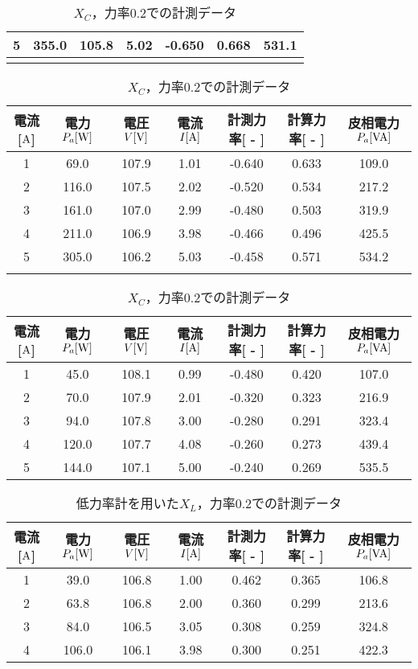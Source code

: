\begin{itemize}
\begin{table}[h]
\begin{tabular}{ccccccc}
	5 & 355.0 & 105.8 & 5.02 & -0.650 & 0.668 & 531.1 \\ \hline\\
\end{tabular}
	\caption{$X_{C}$，力率$0.4$での計測データ}
	\label{tab:0.4data2}
\begin{tabular}{ccccccc}
	\hline
	電流[$\rm{A}$] & 電力$P_a[\rm{W}]$ & 電圧$V[\rm{V}]$ & 電流$I[\rm{A}]$ & 計測力率[ - ] & 計算力率[ - ] & 皮相電力$P_a[\rm{VA}]$ \\ \hline
	1 & 69.0  & 107.9 & 1.01 & -0.640 & 0.633 & 109.0 \\
	2 & 116.0 & 107.5 & 2.02 & -0.520 & 0.534 & 217.2 \\
	3 & 161.0 & 107.0 & 2.99 & -0.480 & 0.503 & 319.9 \\
	4 & 211.0 & 106.9 & 3.98 & -0.466 & 0.496 & 425.5 \\
	5 & 305.0 & 106.2 & 5.03 & -0.458 & 0.571 & 534.2 \\ \hline\\
\end{tabular}
	\caption{$X_{C}$，力率$0.2$での計測データ}
	\label{tab:0.2data2}
\begin{tabular}{ccccccc}
\hline
電流[$\rm{A}$] & 電力$P_a[\rm{W}]$ & 電圧$V[\rm{V}]$ & 電流$I[\rm{A}]$ & 計測力率[ - ] & 計算力率[ - ] & 皮相電力$P_a[\rm{VA}]$ \\ \hline
1 & 45.0  & 108.1 & 0.99 & -0.480 & 0.420 & 107.0 \\
2 & 70.0  & 107.9 & 2.01 & -0.320 & 0.323 & 216.9 \\
3 & 94.0  & 107.8 & 3.00 & -0.280 & 0.291 & 323.4 \\
4 & 120.0 & 107.7 & 4.08 & -0.260 & 0.273 & 439.4 \\
5 & 144.0 & 107.1 & 5.00 & -0.240 & 0.269 & 535.5 \\ \hline
\end{tabular}
\end{table}
\begin{table}[h]
\centering
\caption{低力率計を用いた$X_{L}$，力率$0.2$での計測データ}
\begin{tabular}{ccccccc}
	\hline
	電流[$\rm{A}$] & 電力$P_a[\rm{W}]$ & 電圧$V[\rm{V}]$ & 電流$I[\rm{A}]$ & 計測力率[ - ] & 計算力率[ - ] & 皮相電力$P_a[\rm{VA}]$ \\ \hline
	1 & 39.0  & 106.8 & 1.00 & 0.462 & 0.365 & 106.8 \\
	2 & 63.8  & 106.8 & 2.00 & 0.360 & 0.299 & 213.6 \\
	3 & 84.0  & 106.5 & 3.05 & 0.308 & 0.259 & 324.8 \\
	4 & 106.0 & 106.1 & 3.98 & 0.300 & 0.251 & 422.3 \\ \hline
\end{tabular}
\end{table}
\end{itemize}